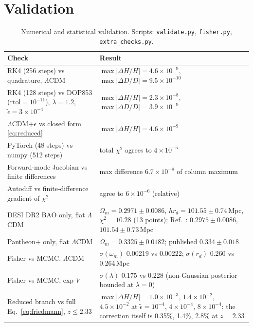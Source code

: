 \documentclass[11pt,a4paper]{article}
\newcommand{\et}{\tilde\epsilon}
\begin{document}
\section{Validation}\label{sec:validation}
\begin{table}[h]\centering\small
\caption{Numerical and statistical validation. Scripts: \texttt{validate.py}, \texttt{fisher.py}, \texttt{extra\_checks.py}.}\label{tab:validation}
\begin{tabular}{p{6.2cm}p{8.3cm}}\toprule
Check & Result\\\midrule
RK4 (256 steps) vs quadrature, $\Lambda$CDM & $\max|\Delta H/H|=4.6\times10^{-9}$, $\max|\Delta D/D|=9.5\times10^{-10}$\\
RK4 (128 steps) vs DOP853 ($\mathrm{rtol}=10^{-11}$), $\lambda=1.2$, $\et=3\times10^{-4}$ & $\max|\Delta H/H|=2.3\times10^{-8}$, $\max|\Delta D/D|=3.9\times10^{-9}$\\
$\Lambda$CDM$+\epsilon$ vs closed form \eqref{eq:reduced} & $\max|\Delta H/H|=4.6\times10^{-9}$\\
PyTorch (48 steps) vs numpy (512 steps) & total $\chi^2$ agrees to $4\times10^{-5}$\\
Forward-mode Jacobian vs finite differences & max difference $6.7\times10^{-8}$ of column maximum\\
Autodiff vs finite-difference gradient of $\chi^2$ & agree to $6\times10^{-6}$ (relative)\\
DESI DR2 BAO only, flat $\Lambda$CDM & $\Omega_m=0.2971\pm0.0086$, $hr_d=101.55\pm0.74$\,Mpc, $\chi^2=10.28$ (13 points); Ref.~\cite{2503.14738}: $0.2975\pm0.0086$, $101.54\pm0.73$\,Mpc\\
Pantheon+ only, flat $\Lambda$CDM & $\Omega_m=0.3325\pm0.0182$; published $0.334\pm0.018$~\cite{2202.04077}\\
Fisher vs MCMC, $\Lambda$CDM & $\sigma(\omega_m)$ 0.00219 vs 0.00222; $\sigma(r_d)$ 0.260 vs 0.264\,Mpc\\
Fisher vs MCMC, exp-$V$ & $\sigma(\lambda)$ 0.175 vs 0.228 (non-Gaussian posterior bounded at $\lambda=0$)\\
Reduced branch vs full Eq.~\eqref{eq:friedmann}, $z\le2.33$ & $\max|\Delta H/H|=1.0\times10^{-3}$, $1.4\times10^{-2}$, $4.5\times10^{-2}$ at $\et=10^{-4}$, $4\times10^{-4}$, $8\times10^{-4}$; the correction itself is 0.35\%, 1.4\%, 2.8\% at $z=2.33$\\
\bottomrule\end{tabular}
\end{table}
\end{document}
